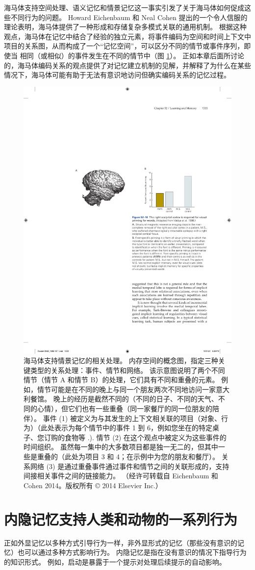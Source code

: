 海马体支持空间处理、语义记忆和情景记忆这一事实引发了关于海马体如何促成这些不同行为的问题。 Howard Eichenbaum 和 Neal Cohen 提出的一个令人信服的理论表明，海马体提供了一种形成和存储复杂多模式关联的通用机制。 根据这种观点，海马体在记忆中结合了经验的独立元素，将事件编码为空间和时间上下文中项目的关系图，从而构成了一个“记忆空间”，可以区分不同的情节或事件序列，即使当 相同（或相似）的事件发生在不同的情节中（图 \ref{fig:52_9}）。 正如本章后面所讨论的，海马体编码关系的观点提供了对记忆建立机制的见解，并解释了为什么在某些情况下，海马体可能有助于无法有意识地访问但确实编码关系的记忆过程。

\begin{figure}[htbp]
	\centering
	\includegraphics[width=0.55\linewidth]{chap52/fig_52_9}
	\caption{海马体支持情景记忆的相关处理。 内存空间的概念图，指定三种关键类型的关系处理：事件、情节和网络。 该示意图说明了两个不同情节（情节 A 和情节 B）的处理，它们具有不同和重叠的元素。 例如，情节可能是在不同的晚上与同一个朋友两次不同地访问一家意大利餐馆。 晚上的经历是截然不同的（不同的日子、不同的天气、不同的心情），但它们也有一些重叠（同一家餐厅的同一位朋友的陪伴）。 事件 (1) 被定义为与其发生的上下文相关联的项目（对象、行为）（此处表示为每个情节中的事件 1 到 6，例如您坐在的特定桌子、您订购的食物等 .). 情节 (2) 在这个观点中被定义为这些事件的时间组织。 虽然每一集中的大多数项目都是独一无二的，但其中一些是重叠的（此处为项目 3 和 4；在示例中为您的朋友和餐厅）。 关系网络 (3) 是通过重叠事件通过事件和情节之间的关联形成的，支持间接相关事件之间的链接能力。 （经许可转载自 Eichenbaum 和 Cohen 2014。版权所有 © 2014 Elsevier Inc.）}
	\label{fig:52_9}
\end{figure}


\section{内隐记忆支持人类和动物的一系列行为}
正如外显记忆以多种方式引导行为一样，非外显形式的记忆（那些没有意识的记忆）也可以通过多种方式影响行为。 内隐记忆是指在没有意识的情况下指导行为的知识形式。 例如，启动是暴露于一个提示对处理后续提示的自动影响。

